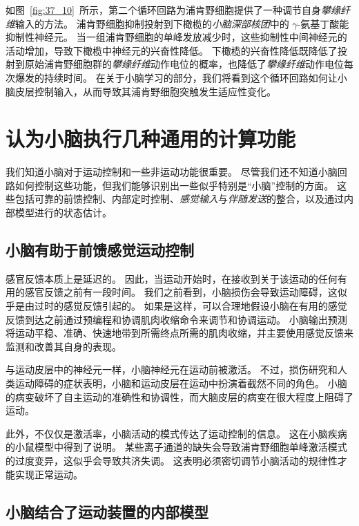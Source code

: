 如图~\ref{fig:37_10}~所示，第二个循环回路为浦肯野细胞提供了一种调节自身\textit{攀缘纤维}输入的方法。
浦肯野细胞抑制投射到下橄榄的\textit{小脑深部核团}中的 $\gamma$-氨基丁酸能抑制性神经元。
当一组浦肯野细胞的单峰发放减少时，这些抑制性中间神经元的活动增加，导致下橄榄中神经元的兴奋性降低。
下橄榄的兴奋性降低既降低了投射到原始浦肯野细胞群的\textit{攀缘纤维}动作电位的概率，也降低了\textit{攀缘纤维}动作电位每次爆发的持续时间。
在关于小脑学习的部分，我们将看到这个循环回路如何让小脑皮层控制输入，从而导致其浦肯野细胞突触发生适应性变化。



\section{认为小脑执行几种通用的计算功能}

我们知道小脑对于运动控制和一些非运动功能很重要。
尽管我们还不知道小脑回路如何控制这些功能，但我们能够识别出一些似乎特别是“小脑”控制的方面。
这些包括可靠的前馈控制、内部定时控制、\textit{感觉输入}与\textit{伴随发送}的整合，以及通过内部模型进行的状态估计。


\subsection{小脑有助于前馈感觉运动控制}

感官反馈本质上是延迟的。
因此，当运动开始时，在接收到关于该运动的任何有用的感官反馈之前有一段时间。
我们之前看到，小脑损伤会导致运动障碍，这似乎是由过时的感觉反馈引起的。
如果是这样，可以合理地假设小脑在有用的感觉反馈到达之前通过预编程和协调肌肉收缩命令来调节和协调运动。
小脑输出预测将运动平稳、准确、快速地带到所需终点所需的肌肉收缩，并主要使用感觉反馈来监测和改善其自身的表现。


与运动皮层中的神经元一样，小脑神经元在运动前被激活。
不过，损伤研究和人类运动障碍的症状表明，小脑和运动皮层在运动中扮演着截然不同的角色。
小脑的病变破坏了自主运动的准确性和协调性，而大脑皮层的病变在很大程度上阻碍了运动。


此外，不仅仅是激活率，小脑活动的模式传达了运动控制的信息。
这在小脑疾病的小鼠模型中得到了说明。
某些离子通道的缺失会导致浦肯野细胞单峰激活模式的过度变异，这似乎会导致共济失调。
这表明必须密切调节小脑活动的规律性才能实现正常运动。



\subsection{小脑结合了运动装置的内部模型}

